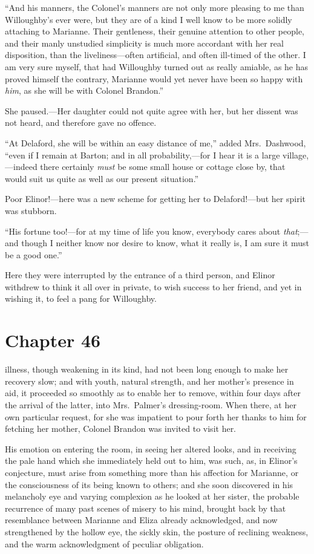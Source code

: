 ``And his manners, the Colonel's manners are not only
more pleasing to me than Willoughby's ever were, but they
are of a kind I well know to be more solidly attaching
to Marianne.  Their gentleness, their genuine attention
to other people, and their manly unstudied simplicity
is much more accordant with her real disposition, than
the liveliness---often artificial, and often ill-timed
of the other.  I am very sure myself, that had Willoughby
turned out as really amiable, as he has proved himself
the contrary, Marianne would yet never have been so happy
with \emph{him}, as she will be with Colonel Brandon.''

She paused.---Her daughter could not quite agree
with her, but her dissent was not heard, and therefore
gave no offence.

``At Delaford, she will be within an easy distance of me,''
added Mrs.\ Dashwood, ``even if I remain at Barton; and in all
probability,---for I hear it is a large village,---indeed there
certainly \emph{must} be some small house or cottage close by,
that would suit us quite as well as our present situation.''

Poor Elinor!---here was a new scheme for getting
her to Delaford!---but her spirit was stubborn.

``His fortune too!---for at my time of life you know,
everybody cares about \emph{that};---and though I neither know
nor desire to know, what it really is, I am sure it must be
a good one.''

Here they were interrupted by the entrance of a
third person, and Elinor withdrew to think it all over
in private, to wish success to her friend, and yet
in wishing it, to feel a pang for Willoughby.



\chapter{Chapter 46}


 illness, though weakening in its kind,
had not been long enough to make her recovery slow;
and with youth, natural strength, and her mother's presence
in aid, it proceeded so smoothly as to enable her to remove,
within four days after the arrival of the latter,
into Mrs.\ Palmer's dressing-room.  When there, at her own
particular request, for she was impatient to pour forth
her thanks to him for fetching her mother, Colonel Brandon
was invited to visit her.

His emotion on entering the room, in seeing her altered
looks, and in receiving the pale hand which she immediately
held out to him, was such, as, in Elinor's conjecture,
must arise from something more than his affection for Marianne,
or the consciousness of its being known to others;
and she soon discovered in his melancholy eye and varying
complexion as he looked at her sister, the probable
recurrence of many past scenes of misery to his mind,
brought back by that resemblance between Marianne and Eliza
already acknowledged, and now strengthened by the hollow eye,
the sickly skin, the posture of reclining weakness,
and the warm acknowledgment of peculiar obligation.

